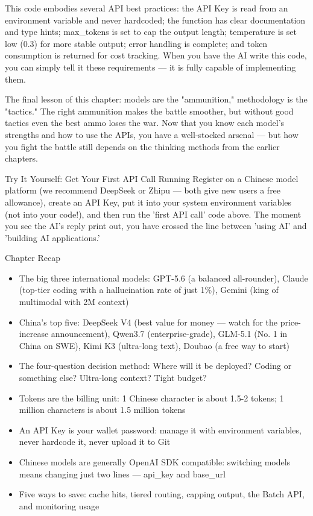 This code embodies several API best practices: the API Key is read from an environment variable and never hardcoded; the function has clear documentation and type hints; max\_tokens is set to cap the output length; temperature is set low (0.3) for more stable output; error handling is complete; and token consumption is returned for cost tracking. When you have the AI write this code, you can simply tell it these requirements — it is fully capable of implementing them.

The final lesson of this chapter: models are the "ammunition," methodology is the "tactics." The right ammunition makes the battle smoother, but without good tactics even the best ammo loses the war. Now that you know each model's strengths and how to use the APIs, you have a well-stocked arsenal — but how you fight the battle still depends on the thinking methods from the earlier chapters.

\begin{tcbpractice}{Try It Yourself: Get Your First API Call Running}
Register on a Chinese model platform (we recommend DeepSeek or Zhipu — both give new users a free allowance), create an API Key, put it into your system environment variables (not into your code!), and then run the 'first API call' code above. The moment you see the AI's reply print out, you have crossed the line between 'using AI' and 'building AI applications.'

\end{tcbpractice}

\begin{tcbsummary}{Chapter Recap}
\begin{itemize}
  \item The big three international models: GPT-5.6 (a balanced all-rounder), Claude (top-tier coding with a hallucination rate of just 1\%), Gemini (king of multimodal with 2M context)
  \item China's top five: DeepSeek V4 (best value for money — watch for the price-increase announcement), Qwen3.7 (enterprise-grade), GLM-5.1 (No. 1 in China on SWE), Kimi K3 (ultra-long text), Doubao (a free way to start)
  \item The four-question decision method: Where will it be deployed? Coding or something else? Ultra-long context? Tight budget?
  \item Tokens are the billing unit: 1 Chinese character is about 1.5-2 tokens; 1 million characters is about 1.5 million tokens
  \item An API Key is your wallet password: manage it with environment variables, never hardcode it, never upload it to Git
  \item Chinese models are generally OpenAI SDK compatible: switching models means changing just two lines — api\_key and base\_url
  \item Five ways to save: cache hits, tiered routing, capping output, the Batch API, and monitoring usage
\end{itemize}

\end{tcbsummary}
